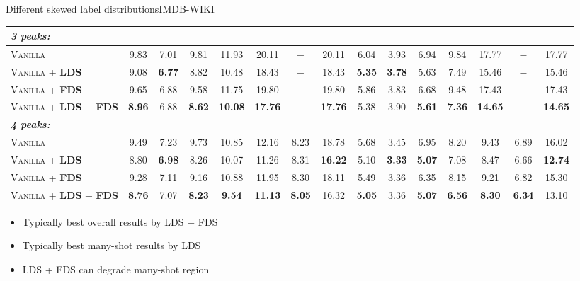 \begin{frame}{Different skewed label distributions}{IMDB-WIKI}
\begin{table}[t]
\begin{center}
{\begin{tabular}{l|ccccccc|ccccccc}
					\multicolumn{9}{l}{\emph{\textbf{3 peaks:}}} \\ \midrule
					\textsc{Vanilla}      & 9.83  & 7.01 & 9.81 & 11.93 & 20.11 & $-$ & 20.11 & 6.04 & 3.93 & 6.94 & 9.84 & 17.77 & $-$ & 17.77 \\ [1.2pt]
					\textsc{Vanilla} + \textbf{\textsc{LDS}} & 9.08 & \textbf{6.77} & 8.82 & 10.48 & 18.43 & $-$ & 18.43 & \textbf{5.35} & \textbf{3.78} & 5.63 & 7.49 & 15.46 & $-$ & 15.46 \\[1.2pt]
					\textsc{Vanilla} + \textbf{\textsc{FDS}} & 9.65 & 6.88 & 9.58 & 11.75 & 19.80 & $-$ & 19.80 & 5.86 & 3.83 & 6.68 & 9.48 & 17.43 & $-$ & 17.43 \\[1.2pt]
					\textsc{Vanilla} + \textbf{\textsc{LDS}} + \textbf{\textsc{FDS}} & \textbf{8.96} & 6.88 & \textbf{8.62} & \textbf{10.08} & \textbf{17.76} & $-$ & \textbf{17.76} & 5.38  & 3.90 & \textbf{5.61} & \textbf{7.36} & \textbf{14.65} & $-$ & \textbf{14.65}  \\ \midrule\midrule
					\multicolumn{9}{l}{\emph{\textbf{4 peaks:}}} \\ \midrule
					\textsc{Vanilla}      & 9.49 & 7.23 & 9.73 & 10.85 & 12.16 & 8.23 & 18.78 & 5.68 & 3.45 & 6.95 & 8.20 & 9.43 & 6.89 & 16.02 \\ [1.2pt]
					\textsc{Vanilla} + \textbf{\textsc{LDS}} & 8.80 & \textbf{6.98} & 8.26 & 10.07 & 11.26 & 8.31 & \textbf{16.22} & 5.10 & \textbf{3.33} & \textbf{5.07} & 7.08 & 8.47 & 6.66 & \textbf{12.74} \\[1.2pt]
					\textsc{Vanilla} + \textbf{\textsc{FDS}} & 9.28 & 7.11 & 9.16 & 10.88 & 11.95 & 8.30 & 18.11 & 5.49 & 3.36 & 6.35 & 8.15 & 9.21 & 6.82 & 15.30 \\[1.2pt]
					\textsc{Vanilla} + \textbf{\textsc{LDS}} + \textbf{\textsc{FDS}} & \textbf{8.76} & 7.07 & \textbf{8.23} & \textbf{9.54} & \textbf{11.13} & \textbf{8.05} & 16.32 & \textbf{5.05} & 3.36 & \textbf{5.07} & \textbf{6.56} & \textbf{8.30} & \textbf{6.34} & 13.10  \\ 
					\bottomrule[1.5pt]
				\end{tabular}
			}
		\end{center}
	\end{table}
	\begin{itemize}\fontsize{7pt}{7.2}\selectfont\setlength\itemsep{.5em}
		\item Typically best overall results by LDS + FDS
		\item Typically best many-shot results by LDS
		\item LDS + FDS can degrade many-shot region
	\end{itemize}
\end{frame}
